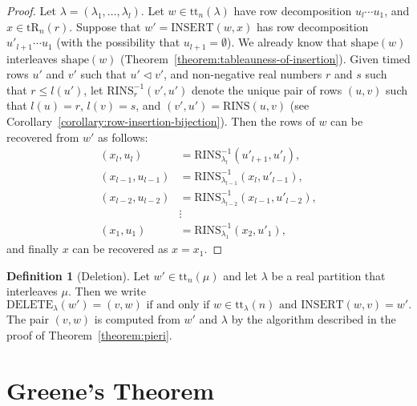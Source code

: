 \documentclass[10pt]{amsproc}
\theoremstyle{definition}
\newtheorem{definition}[theorem]{Definition}
\theoremstyle{remark}
\newcommand{\rowins}{\mathrm{RINS}}
\newcommand{\ins}{\mathrm{INSERT}}
\newcommand{\del}{\mathrm{DELETE}}
\newcommand{\shape}{\mathrm{shape}}
\newcommand{\ttab}{\mathrm{tt}}
\newcommand{\tr}{\mathrm{tR}}
\begin{document}
\begin{proof}
  Let $\lambda=(\lambda_1,\dotsc,\lambda_l)$.
  Let $w\in \ttab_n(\lambda)$ have row decomposition $u_l\dotsb u_1$, and $x\in \tr_n(r)$.
  Suppose that $w'=\ins(w,x)$ has row decomposition $u'_{l+1}\dotsb u_1$ (with the possibility that $u_{l+1}=\emptyset$).
  We already know that $\shape(w)$ interleaves $\shape(w)$ (Theorem~\ref{theorem:tableauness-of-insertion}).
  Given timed rows $u'$ and $v'$ such that $u'\lhd v'$, and non-negative real numbers $r$ and $s$ such that $r\leq l(u')$, let $\rowins^{-1}_r(v',u')$ denote the unique pair of rows $(u,v)$ such that $l(u)=r$, $l(v)=s$, and $(v',u')=\rowins(u,v)$ (see Corollary~\ref{corollary:row-insertion-bijection}).
  Then the rows of $w$ can be recovered from $w'$ as follows:
  \begin{align*}
    (x_l, u_l) & = \rowins^{-1}_{\lambda_l}(u'_{l+1},u'_l),\\
    (x_{l-1},u_{l-1}) & = \rowins^{-1}_{\lambda_{l-1}}(x_l,u'_{l-1}),\\
    (x_{l-2},u_{l-2}) & = \rowins^{-1}_{\lambda_{l-2}}(x_{l-1},u'_{l-2}),\\
    &\vdots\\
    (x_1,u_1) & = \rowins^{-1}_{\lambda_1}(x_2,u'_1),
  \end{align*}
  and finally $x$ can be recovered as $x=x_1$.
\end{proof}
\begin{definition}
  [Deletion]
  \label{definition:deletion}
  Let $w'\in \ttab_n(\mu)$ and let $\lambda$ be a real partition that interleaves $\mu$.
  Then we write
  \begin{displaymath}
    \del_\lambda(w')=(v,w) \text{ if and only if } w\in \ttab_\lambda(n) \text{ and }\ins(w,v)=w'.
  \end{displaymath}
  The pair $(v,w)$ is computed from $w'$ and $\lambda$ by the algorithm described in the proof of Theorem~\ref{theorem:pieri}.
\end{definition}
\section{Greene's Theorem}
\label{sec:greene}
\end{document}
